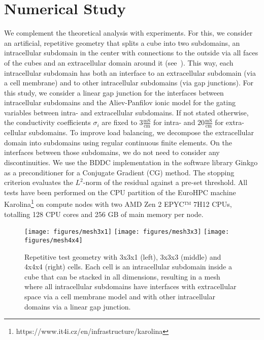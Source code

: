\section{Numerical Study} \label{results}

We complement the theoretical analysis with experiments. For this, we consider an artificial, repetitive geometry that splits a cube into two subdomains, an intracellular subdomain in the center with connections to the outside via all faces of the cubes and an extracellular domain around it (see~). This way, each intracellular subdomain has both an interface to an extracellular subdomain (via a cell membrane) and to other intracellular subdomains (via gap junctions). For this study, we consider a linear gap junction for the interfaces between intracellular subdomains and the Aliev-Panfilov ionic model \cite{aliev} for the gating variables between intra- and extracellular subdomains. If not stated otherwise, the conductivity coefficients $\sigma_i$ are fixed to $3 \frac{\text{mS}}{\text{cm}}$ for intra- and $20 \frac{\text{mS}}{\text{cm}}$ for extra-cellular subdomains. To improve load balancing, we decompose the extracellular domain into subdomains using regular continuous finite elements. On the interfaces between those subdomains, we do not need to consider any discontinuities. We use the BDDC implementation in the software library Ginkgo \cite{ginkgo} as a preconditioner for a Conjugate Gradient (CG) method. The stopping criterion evaluates the $L^2$-norm of the residual against a pre-set threshold. All tests have been performed on the CPU partition of the EuroHPC machine Karolina\footnote{https://www.it4i.cz/en/infrastructure/karolina} on compute nodes with two AMD Zen 2 EPYC™ 7H12 CPUs, totalling 128 CPU cores and 256 GB of main memory per node. 

\begin{figure}[h!]
    \centering
    \texttt{[image: figures/mesh3x1]}
    \texttt{[image: figures/mesh3x3]}
    \texttt{[image: figures/mesh4x4]}
    \caption{Repetitive test geometry with 3x3x1 (left), 3x3x3 (middle) and 4x4x4 (right) cells. Each cell is an intracellular subdomain inside a cube that can be stacked in all dimensions, resulting in a mesh where all intracellular subdomains have interfaces with extracellular space via a cell membrane model and with other intracellular domains via a linear gap junction.}
    \label{fig:mesh}
\end{figure}

